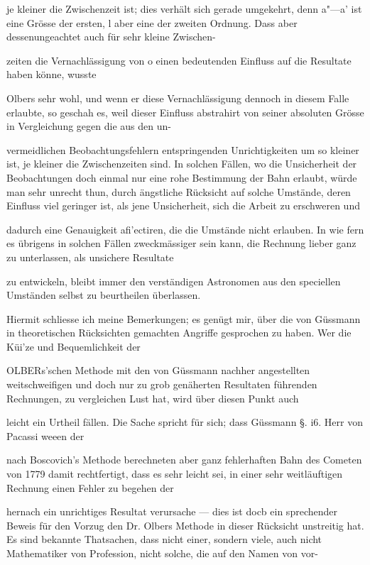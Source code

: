 \documentclass[10pt,a4paper]{article}
\begin{document}
je kleiner die Zwischenzeit ist; dies verhält sich gerade umgekehrt, denn a"—a' ist eine Grösse der ersten, l aber eine der zweiten Ordnung. Dass aber dessenungeachtet auch für sehr kleine Zwischen-

zeiten die Vernachlässigung von o einen bedeutenden Einfluss auf die Resultate haben könne, wusste

Olbers sehr wohl, und wenn er diese Vernachlässigung dennoch in diesem Falle erlaubte, so geschah es, weil dieser Einfluss abstrahirt von seiner absoluten Grösse in Vergleichung gegen die aus den un-

vermeidlichen Beobachtungsfehlern entspringenden Unrichtigkeiten um so kleiner ist, je kleiner die Zwischenzeiten sind. In solchen Fällen, wo die Unsicherheit der Beobachtungen doch einmal nur eine rohe Bestimmung der Bahn erlaubt, würde man sehr unrecht thun, durch ängstliche Rücksicht auf solche Umstände, deren Einfluss viel geringer ist, als jene Unsicherheit, sich die Arbeit zu erschweren und

dadurch eine Genauigkeit afi'ectiren, die die Umstände nicht erlauben. In wie fern es übrigens in solchen Fällen zweckmässiger sein kann, die Rechnung lieber ganz zu unterlassen, als unsichere Resultate

zu entwickeln, bleibt immer den verständigen Astronomen aus den speciellen Umständen selbst zu beurtheilen überlassen.

Hiermit schliesse ich meine Bemerkungen; es genügt mir, über die von Güssmann in theoretischen Rücksichten gemachten Angriffe gesprochen zu haben. Wer die Küi'ze und Bequemlichkeit der

OLBERs'schen Methode mit den von Güssmann nachher angestellten weitschweifigen und doch nur zu grob genäherten Resultaten führenden Rechnungen, zu vergleichen Lust hat, wird über diesen Punkt auch

leicht ein Urtheil fällen. Die Sache spricht für sich; dass Güssmann §. i6. Herr von Pacassi weeen der

nach Boscovich's Methode berechneten aber ganz fehlerhaften Bahn des Cometen von 1779 damit rechtfertigt, dass es sehr leicht sei, in einer sehr weitläuftigen Rechnung einen Fehler zu begehen der

hernach ein unrichtiges Resultat verursache — dies ist docb ein sprechender Beweis für den Vorzug den Dr. Olbers Methode in dieser Rücksicht unstreitig hat. Es sind bekannte Thatsachen, dass nicht einer, sondern viele, auch nicht Mathematiker von Profession, nicht solche, die auf den Namen von vor-
\end{document}
